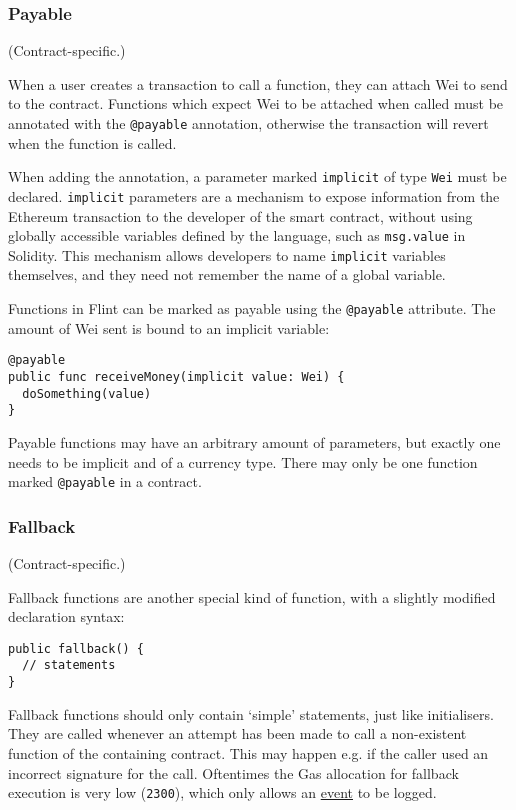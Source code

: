 \subsubsection{Payable}
\label{sec:appendix-b-payable}

(Contract-specific.)

When a user creates a transaction to call a function, they can attach Wei to send to the contract. Functions which expect Wei to be attached when called must be annotated with the \texttt{@payable} annotation, otherwise the transaction will revert when the function is called.

When adding the annotation, a parameter marked \texttt{implicit} of type \texttt{Wei} must be declared. \texttt{implicit} parameters are a mechanism to expose information from the Ethereum transaction to the developer of the smart contract, without using globally accessible variables defined by the language, such as \texttt{msg.value} in Solidity. This mechanism allows developers to name \texttt{implicit} variables themselves, and they need not remember the name of a global variable.

Functions in Flint can be marked as payable using the \texttt{@payable} attribute. The amount of Wei sent is bound to an implicit variable:

\begin{verbatim}
@payable
public func receiveMoney(implicit value: Wei) {
  doSomething(value)
}
\end{verbatim}

Payable functions may have an arbitrary amount of parameters, but exactly one needs to be implicit and of a currency type. There may only be one function marked \texttt{@payable} in a contract.

\subsubsection{Fallback}
\label{sec:appendix-b-fallback}

(Contract-specific.)

Fallback functions are another special kind of function, with a slightly modified declaration syntax:

\begin{verbatim}
public fallback() {
  // statements
}
\end{verbatim}

Fallback functions should only contain `simple' statements, just like initialisers. They are called whenever an attempt has been made to call a non-existent function of the containing contract. This may happen e.g. if the caller used an incorrect signature for the call. Oftentimes the Gas allocation for fallback execution is very low (\texttt{2300}), which only allows an \hyperref[sec:appendix-b-events]{event} to be logged.

